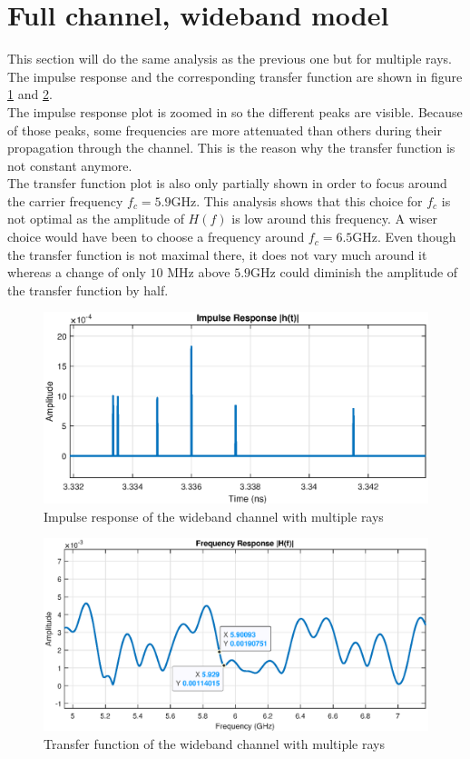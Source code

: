 \documentclass[10pt,a4paper]{ULBreport}
\begin{document}
\section{Full channel, wideband model}

This section will do the same analysis as the previous one but for multiple rays. The impulse response and the corresponding transfer function are shown in figure \ref{fig:impulse_response_full} and \ref{fig:transfer_function_full}. \\
The impulse response plot is zoomed in so the different peaks are visible. Because of those peaks, some frequencies are more attenuated than others during their propagation through the channel. This is the reason why the transfer function is not constant anymore. \\
The transfer function plot is also only partially shown in order to focus around the carrier frequency $f_c = 5.9$GHz. This analysis shows that this choice for $f_c$ is not optimal as the amplitude of $H(f)$ is low around this frequency. A wiser choice would have been to choose a frequency around $f_c = 6.5$GHz. Even though the transfer function is not maximal there, it does not vary much around it whereas a change of only $10$ MHz above $5.9$GHz could diminish the amplitude of the transfer function by half.

\begin{figure}[H]
    \centering
    \includegraphics[width=1\textwidth]{5_1.eps}
    \caption{Impulse response of the wideband channel with multiple rays}
    \label{fig:impulse_response_full}
\end{figure}

\begin{figure}[H]
    \centering
    \includegraphics[width=1\textwidth]{5_2.eps}
    \caption{Transfer function of the wideband channel with multiple rays}
    \label{fig:transfer_function_full}
\end{figure}
\end{document}
